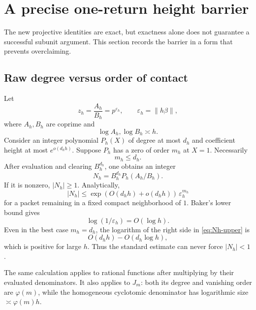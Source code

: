 \documentclass[11pt]{article}
\theoremstyle{definition}
\theoremstyle{remark}
\newcommand{\eps}{\varepsilon}
\begin{document}
\section{A precise one-return height barrier}
\label{sec:height-barrier}

The new projective identities are exact, but exactness alone does not guarantee a successful subunit argument.  This section records the barrier in a form that prevents overclaiming.

\subsection{Raw degree versus order of contact}

Let
\[
 z_h=\frac{A_h}{B_h}=p^{\eps_h},
 \qquad
 \eps_h=\|h\beta\|,
\]
where $A_h,B_h$ are coprime and
\begin{equation}\label{eq:AB-growth}
 \log A_h,\log B_h\asymp h.
\end{equation}
Consider an integer polynomial $P_h(X)$ of degree at most $d_h$ and coefficient height at most $e^{o(d_hh)}$.  Suppose $P_h$ has a zero of order $m_h$ at $X=1$.  Necessarily
\begin{equation}\label{eq:order-degree}
 m_h\le d_h.
\end{equation}
After evaluation and clearing $B_h^{d_h}$, one obtains an integer
\begin{equation}\label{eq:cleared-integer}
 N_h=B_h^{d_h}P_h(A_h/B_h).
\end{equation}
If it is nonzero, $|N_h|\ge1$.  Analytically,
\begin{equation}\label{eq:Nh-upper}
 |N_h|
 \le
 \exp(O(d_hh)+o(d_hh))\,\eps_h^{m_h}
\end{equation}
for a packet remaining in a fixed compact neighborhood of $1$.  Baker's lower bound gives
\[
 \log(1/\eps_h)=O(\log h).
\]
Even in the best case $m_h=d_h$, the logarithm of the right side in \eqref{eq:Nh-upper} is
\begin{equation}\label{eq:budget-loss}
 O(d_hh)-O(d_h\log h),
\end{equation}
which is positive for large $h$.  Thus the standard estimate can never force $|N_h|<1$.

The same calculation applies to rational functions after multiplying by their evaluated denominators.  It also applies to $J_m$: both its degree and vanishing order are $\varphi(m)$, while the homogeneous cyclotomic denominator has logarithmic size $\asymp\varphi(m)h$.
\end{document}
